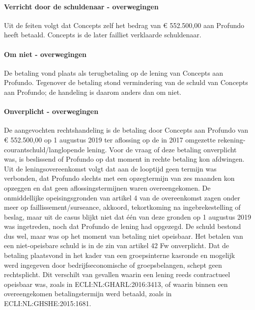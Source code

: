 \documentclass[
  dutch,
  a4paper,
]{article}
\begin{document}
\paragraph{Verricht door de schuldenaar - overwegingen}\label{verricht-door-de-schuldenaar---overwegingen-43}

Uit de feiten volgt dat Concepts zelf het bedrag van € 552.500,00 aan Profundo heeft betaald. Concepts is de later failliet verklaarde schuldenaar.

\paragraph{Om niet - overwegingen}\label{om-niet---overwegingen-43}

De betaling vond plaats als terugbetaling op de lening van Concepts aan Profundo. Tegenover de betaling stond vermindering van de schuld van Concepts aan Profundo; de handeling is daarom anders dan om niet.

\paragraph{Onverplicht - overwegingen}\label{onverplicht---overwegingen-43}

De aangevochten rechtshandeling is de betaling door Concepts aan Profundo van € 552.500,00 op 1 augustus 2019 ter aflossing op de in 2017 omgezette rekening-courantschuld/langlopende lening. Voor de vraag of deze betaling onverplicht was, is beslissend of Profundo op dat moment in rechte betaling kon afdwingen. Uit de leningsovereenkomst volgt dat aan de looptijd geen termijn was verbonden, dat Profundo slechts met een opzegtermijn van zes maanden kon opzeggen en dat geen aflossingstermijnen waren overeengekomen. De onmiddellijke opeisingsgronden van artikel 4 van de overeenkomst zagen onder meer op faillissement/surseance, akkoord, tekortkoming na ingebrekestelling of beslag, maar uit de casus blijkt niet dat één van deze gronden op 1 augustus 2019 was ingetreden, noch dat Profundo de lening had opgezegd. De schuld bestond dus wel, maar was op het moment van betaling niet opeisbaar. Het betalen van een niet-opeisbare schuld is in de zin van artikel 42 Fw onverplicht. Dat de betaling plaatsvond in het kader van een groepsinterne kasronde en mogelijk werd ingegeven door bedrijfseconomische of groepsbelangen, schept geen rechtsplicht. Dit verschilt van gevallen waarin een lening reeds contractueel opeisbaar was, zoals in ECLI:NL:GHARL:2016:3413, of waarin binnen een overeengekomen betalingstermijn werd betaald, zoals in ECLI:NL:GHSHE:2015:1681.
\end{document}
